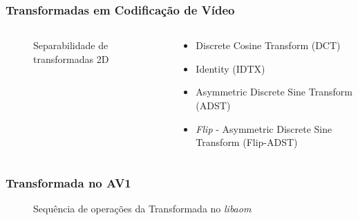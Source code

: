 \documentclass{beamer}
\begin{document}
\begin{frame}
       \frametitle{Transformadas em Codificação de Vídeo}
       \begin{columns}
                     \begin{figure}[h]
                            
                            \caption{Separabilidade de transformadas 2D}
                     \end{figure}
                     \begin{center}
                            \begin{itemize}
                                   \item Discrete Cosine Transform (DCT)
                                   \item Identity (IDTX)
                                   \item Asymmetric Discrete Sine Transform (ADST)
                                   \item \emph{Flip} - Asymmetric Discrete Sine Transform (Flip-ADST)
                            \end{itemize}
                     \end{center}
       \end{columns}
\end{frame}


\begin{frame}
       \frametitle{Transformada no AV1}
       \begin{figure}[h]
              \centering
              
              \caption{Sequência de operações da Transformada no \emph{libaom}}
       \end{figure}
\end{frame}
\end{document}
